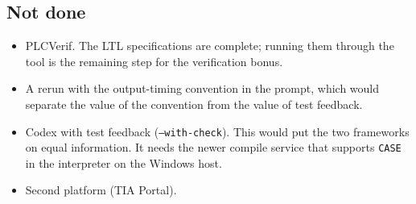 \subsection{Not done}

\begin{itemize}
\item PLCVerif. The LTL specifications are complete; running them through the
      tool is the remaining step for the verification bonus.
\item A rerun with the output-timing convention in the prompt, which would
      separate the value of the convention from the value of test feedback.
\item Codex with test feedback (\texttt{--with-check}). This would put the two
      frameworks on equal information. It needs the newer compile service
      that supports \texttt{CASE} in the interpreter on the Windows host.
\item Second platform (TIA Portal).
\end{itemize}
